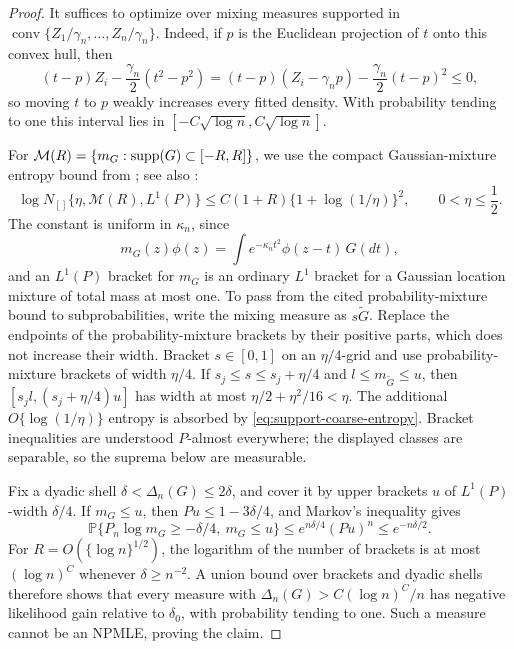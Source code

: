 \begin{proof}
It suffices to optimize over mixing measures supported in
\(\operatorname{conv}\{Z_1/\gamma_n,\ldots,Z_n/\gamma_n\}\). Indeed, if
\(p\) is the Euclidean projection of \(t\) onto this convex hull, then
\[
 (t-p)Z_i-\frac{\gamma_n}{2}(t^2-p^2)
 =(t-p)(Z_i-\gamma_np)-\frac{\gamma_n}{2}(t-p)^2\le0,
\]
so moving \(t\) to \(p\) weakly increases every fitted density. With
probability tending to one this interval lies in
\([-C\sqrt{\log n},C\sqrt{\log n}]\).

For \(\mathcal M(R)=\{m_G:\operatorname{supp}(G)\subset[-R,R]\}\), we use the compact
Gaussian-mixture entropy bound from
\cite[Section~2]{supportDivergenceCompanion}; see also
\cite[Section~3]{ghosal2001entropies}:
\begin{equation}
\label{eq:support-coarse-entropy}
 \log N_{[]}\{\eta,\mathcal M(R),L^1(P)\}
 \le C(1+R)\{1+\log(1/\eta)\}^2,
 \qquad 0<\eta\le\frac12.
\end{equation}
The constant is uniform in \(\kappa_n\), since
\[
    m_G(z)\phi(z)
    =\int e^{-\kappa_n t^2}\phi(z-t)\,G(dt),
\]
and an \(L^1(P)\) bracket for \(m_G\) is an ordinary \(L^1\) bracket for
a Gaussian location mixture of total mass at most one. To pass from the cited
probability-mixture bound to subprobabilities, write the mixing measure as
\(s\widetilde G\). Replace the endpoints of the probability-mixture brackets
by their positive parts, which does not increase their width. Bracket
\(s\in[0,1]\) on an \(\eta/4\)-grid and use probability-mixture brackets of
width \(\eta/4\). If \(s_j\le s\le s_j+\eta/4\) and
\(l\le m_{\widetilde G}\le u\), then
\([s_jl,(s_j+\eta/4)u]\) has width at most
\(\eta/2+\eta^2/16<\eta\). The additional
\(O\{\log(1/\eta)\}\) entropy is absorbed by
\eqref{eq:support-coarse-entropy}. Bracket inequalities are understood
\(P\)-almost everywhere; the displayed classes are separable, so the suprema
below are measurable.

Fix a dyadic shell \(\delta<\Delta_n(G)\le2\delta\), and cover it by upper
brackets \(u\) of \(L^1(P)\)-width \(\delta/4\). If \(m_G\le u\), then
\(Pu\le1-3\delta/4\), and Markov's inequality gives
\[
 \mathbb P\{P_n\log m_G\ge-\delta/4,\ m_G\le u\}
 \le e^{n\delta/4}(Pu)^n\le e^{-n\delta/2}.
\]
For \(R=O(\{\log n\}^{1/2})\), the logarithm of the number of brackets is
at most \((\log n)^C\) whenever \(\delta\ge n^{-2}\). A union bound over
brackets and dyadic shells therefore shows that every measure with
\(\Delta_n(G)>C(\log n)^C/n\) has negative likelihood gain relative to
\(\delta_0\), with probability tending to one. Such a measure cannot be an
NPMLE, proving the claim.
\end{proof}

